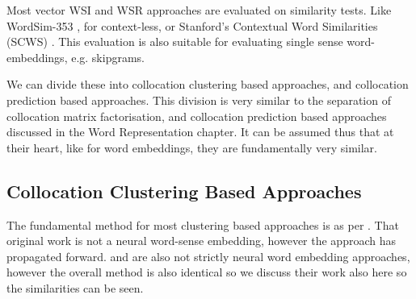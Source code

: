 \documentclass[12pt,parskip]{komatufte}
\begin{document}
Most vector WSI and WSR approaches are evaluated on similarity tests.
Like WordSim-353 \textcite{WordSim353}, for context-less, or Stanford's Contextual Word Similarities (SCWS) \textcite{Huang2012}.
This evaluation is also suitable for evaluating single sense word-embeddings, e.g. skipgrams.


We can divide these into collocation clustering based approaches,
and collocation prediction based approaches.
This division is very similar to the separation of collocation matrix factorisation,
and collocation prediction based approaches discussed in the Word Representation chapter.
It can be assumed thus that at their heart, like for word embeddings,
they are fundamentally very similar.


\subsection{Collocation Clustering Based Approaches}
The fundamental method for most clustering based approaches is as per .
That original work is not a neural word-sense embedding, however the approach has propagated forward.
 and  are also not strictly neural word embedding approaches, however the overall method is also identical so we discuss their work also here so the similarities can be seen.


\end{document}

